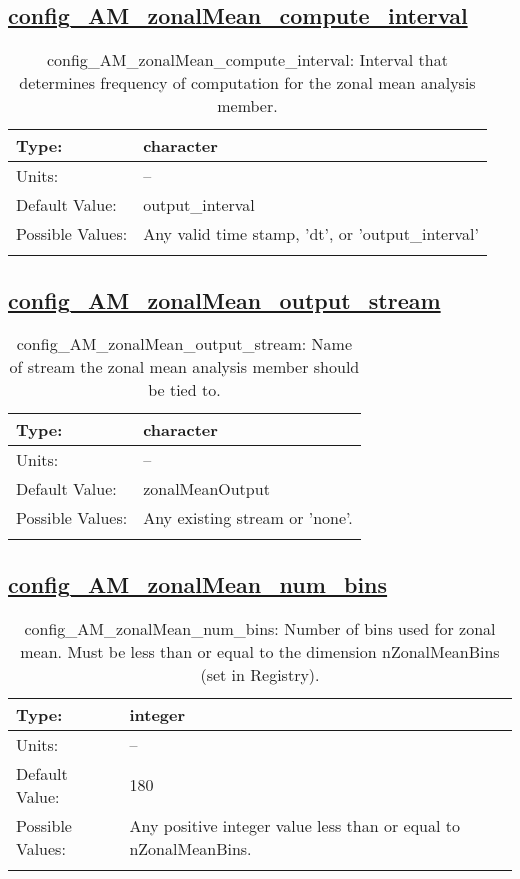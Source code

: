 \subsection[config\_AM\_zonalMean\_compute\_interval]{\hyperref[sec:nm_tab_AM_zonalMean]{config\_AM\_zonalMean\_compute\_interval}}
\label{subsec:nm_sec_config_AM_zonalMean_compute_interval}
\begin{center}
\begin{longtable}{| p{2.0in} || p{4.0in} |}
    \hline
    Type: & character \\
    \hline
    Units: & -- \\
    \hline
    Default Value: & output\_interval \\
    \hline
    Possible Values: & Any valid time stamp, 'dt', or 'output\_interval' \\
    \hline
    \caption{config\_AM\_zonalMean\_compute\_interval: Interval that determines frequency of computation for the zonal mean analysis member.}
\end{longtable}
\end{center}
\subsection[config\_AM\_zonalMean\_output\_stream]{\hyperref[sec:nm_tab_AM_zonalMean]{config\_AM\_zonalMean\_output\_stream}}
\label{subsec:nm_sec_config_AM_zonalMean_output_stream}
\begin{center}
\begin{longtable}{| p{2.0in} || p{4.0in} |}
    \hline
    Type: & character \\
    \hline
    Units: & -- \\
    \hline
    Default Value: & zonalMeanOutput \\
    \hline
    Possible Values: & Any existing stream or 'none'. \\
    \hline
    \caption{config\_AM\_zonalMean\_output\_stream: Name of stream the zonal mean analysis member should be tied to.}
\end{longtable}
\end{center}
\subsection[config\_AM\_zonalMean\_num\_bins]{\hyperref[sec:nm_tab_AM_zonalMean]{config\_AM\_zonalMean\_num\_bins}}
\label{subsec:nm_sec_config_AM_zonalMean_num_bins}
\begin{center}
\begin{longtable}{| p{2.0in} || p{4.0in} |}
    \hline
    Type: & integer \\
    \hline
    Units: & -- \\
    \hline
    Default Value: & 180 \\
    \hline
    Possible Values: & Any positive integer value less than or equal to nZonalMeanBins. \\
    \hline
    \caption{config\_AM\_zonalMean\_num\_bins: Number of bins used for zonal mean.  Must be less than or equal to the dimension nZonalMeanBins (set in Registry).}
\end{longtable}
\end{center}
